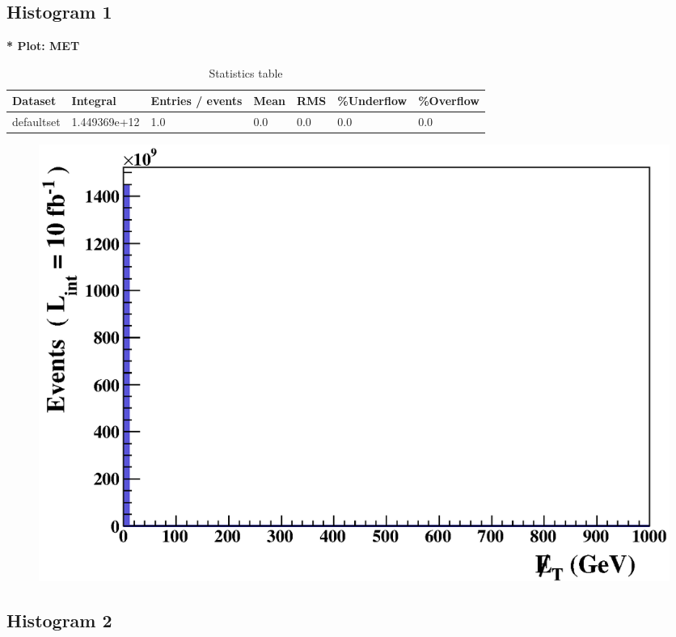 \documentclass[a4paper, 11pt]{article}
\begin{document}
\subsection{ Histogram 1}

   \textbf{   * Plot: MET}
\textbf{ }\begin{table}[!h]
  \begin{center}
    \caption{ Statistics table}
    \begin{tabular}{|m{17.0mm}|m{27.0mm}|m{23.0mm}|m{18.0mm}|m{18.0mm}|m{14.0mm}|m{14.0mm}|}
      \hline
      \cellcolor{yellow}         Dataset& \cellcolor{yellow}         Integral& \cellcolor{yellow}         Entries /\- events& \cellcolor{yellow}         Mean& \cellcolor{yellow}         RMS& \cellcolor{yellow}         \%Underflow& \cellcolor{yellow}         \%Overflow\\
      \hline
      \cellcolor{white}         defaultset& \cellcolor{white}         1.449369e+12& \cellcolor{white}         1.0& \cellcolor{white}         0.0& \cellcolor{white}         0.0& \cellcolor{green}         0.0& \cellcolor{green}         0.0\\
\hline
    \end{tabular}
  \end{center}
\end{table}

\begin{figure}[!h]
  \begin{center}
    \includegraphics[scale=0.6]{selection_0.eps}\\
\caption{}
  \end{center}
\end{figure}
\newpage
   \newpage
\subsection{ Histogram 2}
\end{document}
